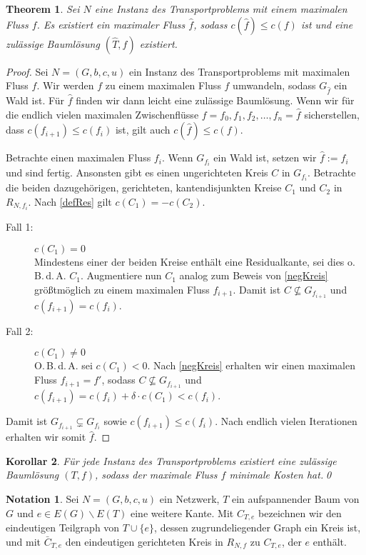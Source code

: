 \documentclass[a4paper,twoside,ngerman]{report}
\theoremstyle{plain}
\newtheorem{thm}{Theorem}
\newtheorem{kor}[thm]{Korollar}
\theoremstyle{definition}
\newtheorem*{nota}{Notation}
\newcommand{\obda}{o.\,B.\,d.\,A. }
\newcommand{\Obda}{O.\,B.\,d.\,A. }
\begin{document}
\begin{thm}Sei $N$ eine Instanz des Transportproblems mit einem maximalen Fluss $f$. Es existiert ein maximaler Fluss $\hat{f}$, sodass $c(\hat{f})\leq c(f)$ ist und eine zulässige Baumlösung $(\hat{T},\hat{f})$ existiert.\end{thm}
\begin{proof}Sei $N=(G,b,c,u)$ ein Instanz des Transportproblems mit maximalen Fluss $f$. Wir werden $f$ zu einem maximalen Fluss $\hat{f}$ umwandeln, sodass $G_{\hat{f}}$ ein Wald ist. Für $\hat{f}$ finden wir dann leicht eine zulässige Baumlösung. Wenn wir für die endlich vielen maximalen Zwischenflüsse $f=f_0,f_1,f_2,\ldots,f_n=\hat{f}$ sicherstellen, dass $c(f_{i+1})\leq c(f_i)$ ist, gilt auch $c(\hat{f})\leq c(f)$.

Betrachte einen maximalen Fluss $f_i$. Wenn $G_{f_i}$ ein Wald ist, setzen wir $\hat{f}:=f_i$ und sind fertig. Ansonsten gibt es einen ungerichteten Kreis $C$ in $G_{f_i}$. Betrachte die beiden dazugehörigen, gerichteten, kantendisjunkten Kreise $C_1$ und $C_2$ in $R_{N,f_i}$. Nach \cref{defRes} gilt $c(C_1)=-c(C_2)$.
\begin{description}
\item[Fall 1:] $c(C_1)=0$\\
	Mindestens einer der beiden Kreise enthält eine Residualkante, sei dies \obda $C_1$. Augmentiere nun $C_1$ analog zum Beweis von \cref{negKreis} größtmöglich zu einem maximalen Fluss $f_{i+1}$. Damit ist $C\nsubseteq G_{f_{i+1}}$ und $c(f_{i+1}) = c(f_i)$.
\item[Fall 2:] $c(C_1)\neq0$\\
	\Obda sei $c(C_1)<0$. Nach \cref{negKreis} erhalten wir einen maximalen Fluss $f_{i+1}=f'$, sodass $C\nsubseteq G_{f_{i+1}}$ und $c(f_{i+1}) = c(f_i) + \delta\cdot c(C_1)<c(f_i)$.
\end{description}

Damit ist $G_{f_{i+1}}\subsetneq G_{f_i}$ sowie $c(f_{i+1})\leq c(f_i)$. Nach endlich vielen Iterationen erhalten wir somit $\hat{f}$.
\end{proof}

\begin{kor}\label{minCostFlow}Für jede Instanz des Transportproblems existiert eine zulässige Baumlösung $(T,f)$, sodass der maximale Fluss $f$ minimale Kosten hat.\qed\end{kor}

\begin{nota}Sei $N=(G,b,c,u)$ ein Netzwerk, $T$ ein aufspannender Baum von $G$ und $e\in E(G)\backslash E(T)$ eine weitere Kante. Mit $C_{T,e}$ bezeichnen wir den eindeutigen Teilgraph von $T\cup\{e\}$, dessen zugrundeliegender Graph ein Kreis ist, und mit  $\bar{C}_{T,e}$ den eindeutigen gerichteten Kreis in $R_{N,f}$ zu $C_{T,e}$, der $e$ enthält.\end{nota}
\end{document}
